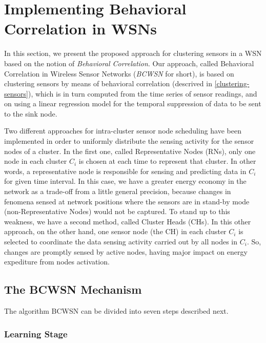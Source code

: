 \documentclass[conference]{IEEEtran}
\begin{document}
\section{Implementing Behavioral Correlation in WSNs}

In this section, we present the proposed approach for clustering sensors in a
WSN based on the notion of {\it Behavioral Correlation}. Our approach, called
Behavioral Correlation in Wireless Sensor Networks (\textit{BCWSN} for short),
is based on clustering sensors by means of behavioral correlation (descrived in
\ref{clustering-sensors}), which is in turn computed from the time series of
sensor readings, and on using a linear regression model for the temporal
suppression of data to be sent to the sink node.

Two different approaches for intra-cluster sensor node scheduling have been
implemented in order to uniformly distribute the sensing activity for the
sensor nodes of a cluster. In the first one, called Representative Nodes (RNs),
only one node in each cluster $C_{i}$ is chosen at each time to represent that
cluster. In other words, a representative node is responsible for sensing and
predicting data in $C_{i}$ for given time interval. In this case, we have a
greater energy economy in the network as a trade-off from a little
general precision, because changes in fenomena sensed at network positions where
the sensors are in stand-by mode (non-Representative Nodes) would not be
captured. To stand up to this weakness, we have a second method, called
Cluster Heads (CHs). In this other approach, on the other hand, one sensor node
(the CH) in each cluster $C_{i}$ is selected to coordinate the data sensing
activity carried out by all nodes in $C_{i}$. So, changes are promptly sensed by
active nodes, having major impact on energy expediture from nodes activation.

\subsection{The BCWSN Mechanism}


The algorithm BCWSN can be divided into seven steps described next.


\subsubsection{Learning Stage}
\end{document}
